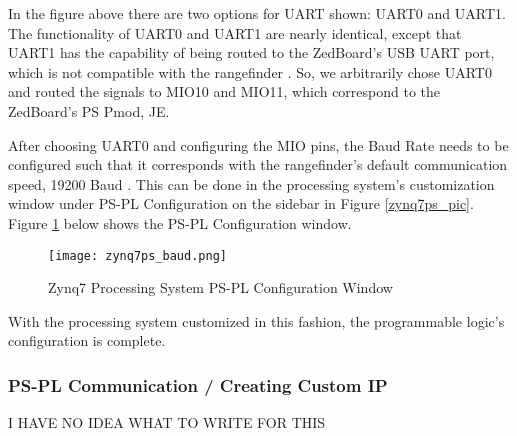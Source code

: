 In the figure above there are two options for UART shown: UART0 and UART1. The functionality of UART0 and UART1 are nearly identical, except that UART1 has the capability of being routed to the ZedBoard's USB UART port, which is not compatible with the rangefinder \cite{zedboard_datasheet}. So, we arbitrarily chose UART0 and routed the signals to MIO10 and MIO11, which correspond to the ZedBoard's PS Pmod, JE.
\par
After choosing UART0 and configuring the MIO pins, the Baud Rate needs to be configured such that it corresponds with the rangefinder's default communication speed, 19200 Baud \cite{urg04lx_datasheet}. This can be done in the processing system's customization window under PS-PL Configuration on the sidebar in Figure \ref{zynq7ps_pic}. Figure \ref{zynq7ps_baud_pic} below shows the PS-PL Configuration window.

\begin{figure}[H]
	\centerline{\texttt{[image: zynq7ps\_baud.png]}}
	\caption{Zynq7 Processing System PS-PL Configuration Window}
	\label{zynq7ps_baud_pic}
\end{figure}

With the processing system customized in this fashion, the programmable logic's configuration is complete.

\subsubsection{PS-PL Communication / Creating Custom IP}
I HAVE NO IDEA WHAT TO WRITE FOR THIS